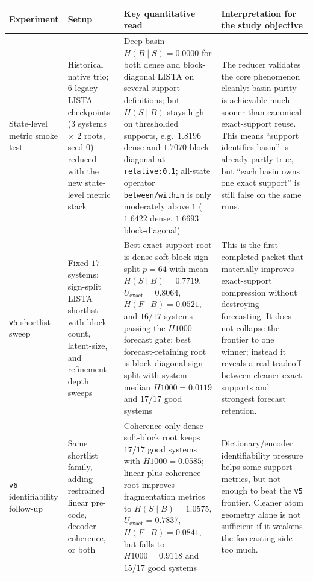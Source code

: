 \documentclass[11pt]{article}
\begin{document}
\begin{table}[t]
\centering
\footnotesize
\begin{tabular}{p{2.6cm} p{2.8cm} p{4.0cm} p{5.0cm}}
\toprule
Experiment & Setup & Key quantitative read & Interpretation for the study objective \\
\midrule
State-level metric smoke test & Historical native trio; $6$ legacy LISTA checkpoints ($3$ systems $\times$ $2$ roots, seed $0$) reduced with the new state-level metric stack & Deep-basin $H(B \mid S)=0.0000$ for both dense and block-diagonal LISTA on several support definitions; but $H(S \mid B)$ stays high on thresholded supports, e.g.\ $1.8196$ dense and $1.7070$ block-diagonal at \texttt{relative:0.1}; all-state operator \texttt{between/within} is only moderately above $1$ ($1.6422$ dense, $1.6693$ block-diagonal) & The reducer validates the core phenomenon cleanly: basin purity is achievable much sooner than canonical exact-support reuse. This means ``support identifies basin'' is already partly true, but ``each basin owns one exact support'' is still false on the same runs. \\
\addlinespace
\texttt{v5} shortlist sweep & Fixed $17$ systems; sign-split LISTA shortlist with block-count, latent-size, and refinement-depth sweeps & Best exact-support root is dense soft-block sign-split $p=64$ with mean $H(S \mid B)=0.7719$, $U_{\text{exact}}=0.8064$, $H(F \mid B)=0.0521$, and $16/17$ systems passing the $H1000$ forecast gate; best forecast-retaining root is block-diagonal sign-split with system-median $H1000=0.0119$ and $17/17$ good systems & This is the first completed packet that materially improves exact-support compression without destroying forecasting. It does not collapse the frontier to one winner; instead it reveals a real tradeoff between cleaner exact supports and strongest forecast retention. \\
\addlinespace
\texttt{v6} identifiability follow-up & Same shortlist family, adding restrained linear pre-code, decoder coherence, or both & Coherence-only dense soft-block root keeps $17/17$ good systems with $H1000=0.0585$; linear-plus-coherence root improves fragmentation metrics to $H(S \mid B)=1.0575$, $U_{\text{exact}}=0.7837$, $H(F \mid B)=0.0841$, but falls to $H1000=0.9118$ and $15/17$ good systems & Dictionary/encoder identifiability pressure helps some support metrics, but not enough to beat the \texttt{v5} frontier. Cleaner atom geometry alone is not sufficient if it weakens the forecasting side too much. \\

\end{tabular}
\end{table}
\end{document}

